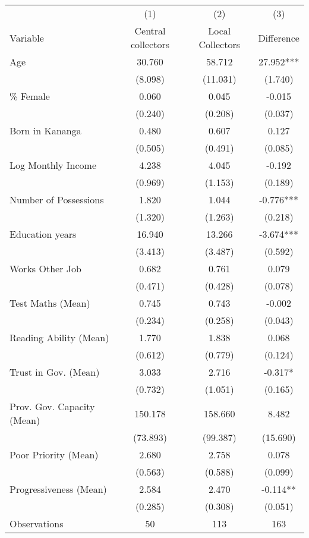 \begin{tabular}{l*{3}c}
\hline\hline
 & (1) & (2) & (3) \\
Variable & Central collectors & Local Collectors & Difference \\
\hline
Age&30.760&58.712&27.952***\\
&(8.098)&(11.031)&(1.740)\\
\% Female&0.060&0.045&-0.015\\
&(0.240)&(0.208)&(0.037)\\
Born in Kananga&0.480&0.607&0.127\\
&(0.505)&(0.491)&(0.085)\\
Log Monthly Income&4.238&4.045&-0.192\\
&(0.969)&(1.153)&(0.189)\\
Number of Possessions&1.820&1.044&-0.776***\\
&(1.320)&(1.263)&(0.218)\\
Education years&16.940&13.266&-3.674***\\
&(3.413)&(3.487)&(0.592)\\
Works Other Job&0.682&0.761&0.079\\
&(0.471)&(0.428)&(0.078)\\
Test Maths (Mean)&0.745&0.743&-0.002\\
&(0.234)&(0.258)&(0.043)\\
Reading Ability (Mean)&1.770&1.838&0.068\\
&(0.612)&(0.779)&(0.124)\\
Trust in Gov. (Mean)&3.033&2.716&-0.317*\\
&(0.732)&(1.051)&(0.165)\\
Prov. Gov. Capacity (Mean)&150.178&158.660&8.482\\
&(73.893)&(99.387)&(15.690)\\
Poor Priority (Mean)&2.680&2.758&0.078\\
&(0.563)&(0.588)&(0.099)\\
Progressiveness (Mean)&2.584&2.470&-0.114**\\
&(0.285)&(0.308)&(0.051)\\
\hline
Observations & 50 & 113 & 163 \\
\hline\hline
\end{tabular}
